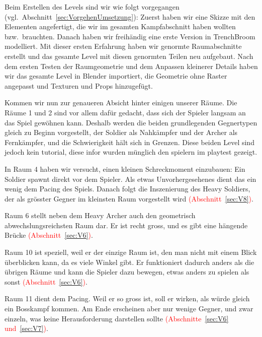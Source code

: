 \documentclass[../Main.tex]{subfiles}
\begin{document}
Beim Erstellen des Levels sind wir wie folgt vorgegangen (vgl.\ Abschnitt~\ref{sec:VorgehenUmsetzung}): Zuerst haben wir eine Skizze mit den Elementen angefertigt, die wir im gesamten Kampfabschnitt haben wollten bzw.\ brauchten. Danach haben wir freihändig eine erste Version in TrenchBroom modelliert. Mit dieser ersten Erfahrung haben wir genormte Raumabschnitte erstellt und das gesamte Level mit diesen genormten Teilen neu aufgebaut. Nach dem ersten Testen der Raumgeometrie und dem Anpassen kleinerer Details haben wir das gesamte Level in Blender importiert, die Geometrie ohne Raster angepasst und Texturen und Props hinzugefügt.

Kommen wir nun zur genaueren Absicht hinter einigen unserer Räume. Die Räume 1 und 2 sind vor allem dafür gedacht, dass sich der Spieler langsam an das Spiel gewöhnen kann. Deshalb werden die beiden grundlegenden Gegnertypen gleich zu Beginn vorgestellt, der Soldier als Nahkämpfer und der Archer als Fernkämpfer, und die Schwierigkeit hält sich in Grenzen. Diese beiden Level sind jedoch kein tutorial, diese infor wurden münglich den spielern im playtest gezeigt.

In Raum 4 haben wir versucht, einen kleinen Schreckmoment einzubauen: Ein Soldier spawnt direkt vor dem Spieler. Als etwas Unvorhergesehenes dient das ein wenig dem Pacing des Spiels. Danach folgt die Inszenierung des Heavy Soldiers, der als grösster Gegner im kleinsten Raum vorgestellt wird\textcolor{red}{ (Abschnitt~\ref{sec:V8})}.

Raum 6 stellt neben dem Heavy Archer auch den geometrisch abwechslungsreichsten Raum dar. Er ist recht gross, und es gibt eine hängende Brücke\textcolor{red}{ (Abschnitt~\ref{sec:V6})}.

Raum 10 ist speziell, weil er der einzige Raum ist, den man nicht mit einem Blick überblicken kann, da es viele Winkel gibt. Er funktioniert dadurch anders als die übrigen Räume und kann die Spieler dazu bewegen, etwas anders zu spielen als sonst\textcolor{red}{ (Abschnitt~\ref{sec:V6})}.

Raum 11 dient dem Pacing. Weil er so gross ist, soll er wirken, als würde gleich ein Bosskampf kommen. Am Ende erscheinen aber nur wenige Gegner, und zwar einzeln, was keine Herausforderung darstellen sollte\textcolor{red}{ (Abschnitte~\ref{sec:V6} und~\ref{sec:V7})}.
\end{document}
